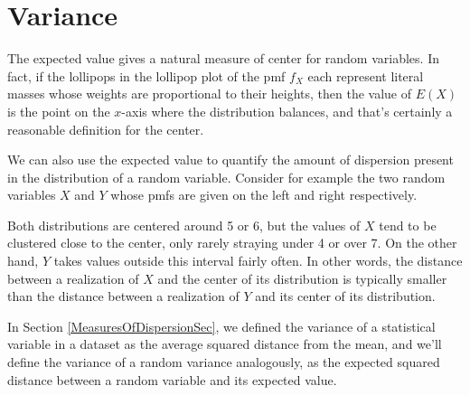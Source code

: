 
\section{Variance}

The expected value gives a natural measure of center for random variables. In fact, if the lollipops in the lollipop plot of the pmf $f_X$ each represent literal masses whose weights are proportional to their heights, then the value of $E(X)$ is the point on the $x$-axis where the distribution balances, and that's certainly a reasonable definition for the center.

We can also use the expected value to quantify the amount of dispersion present in the distribution of a random variable. Consider for example the two random variables $X$ and $Y$ whose pmfs are given on the left and right respectively.
\begin{center}
\qquad\qquad{}
\end{center}

Both distributions are centered around 5 or 6, but the values of $X$ tend to be clustered close to the center, only rarely straying under 4 or over 7. On the other hand, $Y$ takes values outside this interval fairly often. In other words, the distance between a realization of $X$ and the center of its distribution is typically smaller than the distance between a realization of $Y$ and its center of its distribution. 

In Section \ref{MeasuresOfDispersionSec}, we defined the variance of a statistical variable in a dataset as the average squared distance from the mean, and we'll define the variance of a random variance analogously, as the expected squared distance between a random variable and its expected value.

